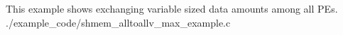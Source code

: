 \begin{apidefinition}
\begin{apiexamples}

\apicexample
    {This example shows  exchanging variable sized
    data amounts among all \acp{PE}.}
    {./example_code/shmem_alltoallv_max_example.c}
    {}

\end{apiexamples}

\end{apidefinition}

